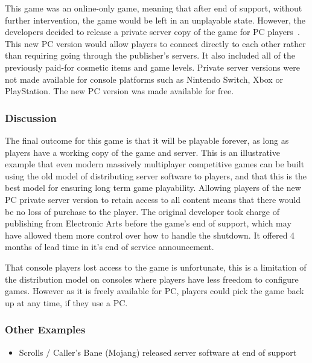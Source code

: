 This game was an online-only game, meaning that after end of support, without further intervention, the game would be left in an unplayable state.
However, the developers decided to release a private server copy of the game for PC players~\cite{knockout-private}.
This new PC version would allow players to connect directly to each other rather than requiring going through the publisher's servers.
It also included all of the previously paid-for cosmetic items and game levels.
Private server versions were not made available for console platforms such as Nintendo Switch, Xbox or PlayStation.
The new PC version was made available for free.

\subsubsection*{Discussion}
The final outcome for this game is that it will be playable forever, as long as players have a working copy of the game and server.
This is an illustrative example that even modern massively multiplayer competitive games can be built using the old model of distributing server software to players,
and that this is the best model for ensuring long term game playability.
Allowing players of the new PC private server version to retain access to all content means that there would be no loss of purchase to the player.
The original developer took charge of publishing from Electronic Arts before the game's end of support, which may have allowed them more control over how to handle the shutdown.
It offered 4 months of lead time in it's end of service announcement.

That console players lost access to the game is unfortunate, this is a limitation of the distribution model on consoles where players have less freedom to configure games.
However as it is freely available for PC, players could pick the game back up at any time, if they use a PC.

\subsubsection*{Other Examples}
\begin{itemize}
    \item Scrolls / Caller's Bane (Mojang) released server software at end of support\cite{scrolls-server-2018}
\end{itemize}

